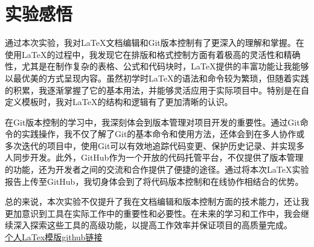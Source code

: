 \documentclass[12pt,a4paper,UTF8]{article}
\begin{document}
    \section{实验感悟}
    通过本次实验，我对LaTeX文档编辑和Git版本控制有了更深入的理解和掌握。在使用LaTeX的过程中，我发现它在排版和格式控制方面有着极高的灵活性和精确性，尤其是在制作复杂的表格、公式和代码块时，LaTeX提供的丰富功能让我能够以最优美的方式呈现内容。虽然初学时LaTeX的语法和命令较为繁琐，但随着实践的积累，我逐渐掌握了它的基本用法，并能够灵活应用于实际项目中。特别是在自定义模板时，我对LaTeX的结构和逻辑有了更加清晰的认识。

    在Git版本控制的学习中，我深刻体会到版本管理对项目开发的重要性。通过Git命令的实践操作，我不仅了解了Git的基本命令和使用方法，还体会到在多人协作或多次迭代的项目中，使用Git可以有效地追踪代码变更、保护历史记录、并实现多人同步开发。此外，GitHub作为一个开放的代码托管平台，不仅提供了版本管理的功能，还为开发者之间的交流和合作提供了便捷的途径。通过将本次LaTeX实验报告上传至GitHub，我切身体会到了将代码版本控制和在线协作相结合的优势。

    总的来说，本次实验不仅提升了我在文档编辑和版本控制方面的技术能力，还让我更加意识到工具在实际工作中的重要性和必要性。在未来的学习和工作中，我会继续深入探索这些工具的高级功能，以提高工作效率并保证项目的高质量完成。\\[12pt]

    \href{https://github.com/JOINKINGER/My-LaTex-Mould}{个人LaTex模版github链接}
\end{document}
